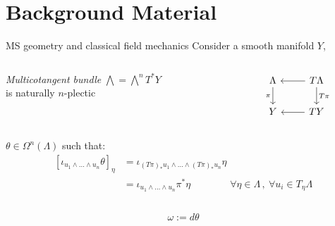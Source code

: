 \documentclass[beamer,10pt]{standalone}
\begin{document}

\section{Background Material}

\begin{frame}[fragile]{MS geometry and classical field mechanics}\label{Frame:Ms-Field-Mechanics}
		Consider a smooth manifold $Y$,
		\begin{columns}
			\hfill
			\begin{column}{.5\linewidth}
				\emph{Multicotangent bundle} $\bigwedge = \bigwedge^n T^\ast Y$\\
				is naturally $n$-plectic
			\end{column}
			\begin{column}{.4\linewidth}
				\[
				\begin{tikzcd}
					\Lambda \ar[d,"\pi"'] & T \Lambda \ar[d,"T \pi"] \ar[l] \\
					Y								& T Y \ar[l]
				\end{tikzcd}	
				\]
			\end{column}
		\end{columns}
	\pause
	\begin{defblock}
		$\theta \in \Omega^n(\Lambda)$ such that:
		\begin{displaymath}
		\begin{split}
			\left[ \iota_{u_1 \wedge \ldots \wedge u_n} \theta \right]_\eta 
			&= \iota_{(T \pi)_\ast u_1 \wedge \ldots \wedge (T \pi)_\ast u_n} \eta \\
			&= \iota_{u_1 \wedge \ldots \wedge u_n} \pi^\ast \eta 
			\qquad \qquad \forall \eta \in \Lambda \, , \: \forall u_i \in T_\eta \Lambda 		
		\end{split}
		\end{displaymath}
	\end{defblock}
	\vfill
	\begin{columns}
		\begin{column}{.6\linewidth}
			\begin{defblock}
				$$\omega := d \theta$$

\end{defblock}
\end{column}
\end{columns}
\end{frame}
\end{document}

